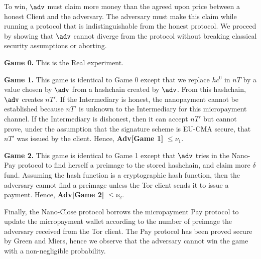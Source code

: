 To win, $\adv$ must claim more money than the agreed upon price between a honest
Client and the adversary. The adversary must make this claim while running a
protocol that is indistinguishable from the honest protocol. We proceed by
showing that $\adv$ cannot diverge from the protocol without breaking classical
security assumptions or aborting.

\textbf{Game 0.} This is the Real experiment.

\textbf{Game 1.} This game is identical to Game 0 except that we replace $hc^0$ in $nT$ by a value chosen by $\adv$ from a hashchain created by $\adv$. From this hashchain, $\adv$ creates $nT'$. If the Intermediary is honest, the nanopayment cannot be established because $nT'$ is unknown to the Intermediary for this micropayment channel. If the Intermediary is dishonest, then it can accept $nT'$ but cannot prove, under the assumption that the signature scheme is EU-CMA secure, that $nT'$ was issued by the client. Hence, \textbf{Adv[Game 1]} $\leq \nu_1$.

\textbf{Game 2.} This game is identical to Game 1 except that $\adv$ tries in the Nano-Pay protocol to find herself a preimage to the stored hashchain, and claim more $\delta$ fund. Assuming the hash function is a cryptographic hash function, then the adversary cannot find a preimage unless the Tor client sends it to issue a payment. Hence, \textbf{Adv[Game 2]} $\leq \nu_2$.

Finally, the Nano-Close protocol borrows the micropayment Pay protocol to update the micropayment wallet according to the number of preimage the adversary received from the Tor client. The Pay protocol has been proved secure by Green and Miers, hence we observe that the adversary cannot win the game with a non-negligible probability.